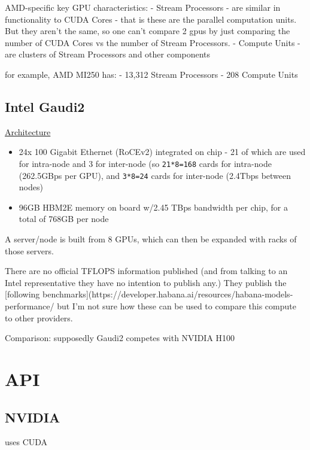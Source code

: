 \documentclass[
]{report}
\providecommand{\tightlist}{%
  \setlength{\itemsep}{0pt}\setlength{\parskip}{0pt}}\usepackage{longtable,booktabs,array}
\begin{document}
AMD-specific key GPU characteristics: - Stream Processors - are similar
in functionality to CUDA Cores - that is these are the parallel
computation units. But they aren't the same, so one can't compare 2 gpus
by just comparing the number of CUDA Cores vs the number of Stream
Processors. - Compute Units - are clusters of Stream Processors and
other components

for example, AMD MI250 has: - 13,312 Stream Processors - 208 Compute
Units

\subsection{Intel Gaudi2}\label{intel-gaudi2}

\href{https://docs.habana.ai/en/latest/Gaudi_Overview/Gaudi_Architecture.html}{Architecture}

\begin{itemize}
\tightlist
\item
  24x 100 Gigabit Ethernet (RoCEv2) integrated on chip - 21 of which are
  used for intra-node and 3 for inter-node (so \texttt{21*8=168} cards
  for intra-node (262.5GBps per GPU), and \texttt{3*8=24} cards for
  inter-node (2.4Tbps between nodes)
\item
  96GB HBM2E memory on board w/2.45 TBps bandwidth per chip, for a total
  of 768GB per node
\end{itemize}

A server/node is built from 8 GPUs, which can then be expanded with
racks of those servers.

There are no official TFLOPS information published (and from talking to
an Intel representative they have no intention to publish any.) They
publish the {[}following
benchmarks{]}(https://developer.habana.ai/resources/habana-models-performance/
but I'm not sure how these can be used to compare this compute to other
providers.

Comparison: supposedly Gaudi2 competes with NVIDIA H100

\section{API}\label{api}

\subsection{NVIDIA}\label{nvidia-1}

uses CUDA
\end{document}
